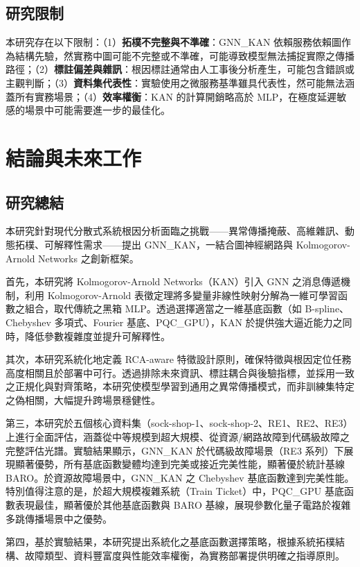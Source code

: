 \documentclass[10pt,a4paper,twocolumn]{article}
\begin{document}
\subsection{研究限制}

本研究存在以下限制：（1）\textbf{拓樸不完整與不準確}：GNN\_KAN 依賴服務依賴圖作為結構先驗，然實務中圖可能不完整或不準確，可能導致模型無法捕捉實際之傳播路徑；（2）\textbf{標註偏差與雜訊}：根因標註通常由人工事後分析產生，可能包含錯誤或主觀判斷；（3）\textbf{資料集代表性}：實驗使用之微服務基準雖具代表性，然可能無法涵蓋所有實務場景；（4）\textbf{效率權衡}：KAN 的計算開銷略高於 MLP，在極度延遲敏感的場景中可能需要進一步的最佳化。

\section{結論與未來工作}

\subsection{研究總結}

本研究針對現代分散式系統根因分析面臨之挑戰——異常傳播掩蔽、高維雜訊、動態拓樸、可解釋性需求——提出 GNN\_KAN，一結合圖神經網路與 Kolmogorov-Arnold Networks 之創新框架。

首先，本研究將 Kolmogorov-Arnold Networks（KAN）引入 GNN 之消息傳遞機制，利用 Kolmogorov-Arnold 表徵定理將多變量非線性映射分解為一維可學習函數之組合，取代傳統之黑箱 MLP。透過選擇適當之一維基底函數（如 B-spline、Chebyshev 多項式、Fourier 基底、PQC\_GPU），KAN 於提供強大逼近能力之同時，降低參數複雜度並提升可解釋性。

其次，本研究系統化地定義 RCA-aware 特徵設計原則，確保特徵與根因定位任務高度相關且於部署中可行。透過排除未來資訊、標註耦合與後驗指標，並採用一致之正規化與對齊策略，本研究使模型學習到通用之異常傳播模式，而非訓練集特定之偽相關，大幅提升跨場景穩健性。

第三，本研究於五個核心資料集（sock-shop-1、sock-shop-2、RE1、RE2、RE3）上進行全面評估，涵蓋從中等規模到超大規模、從資源/網路故障到代碼級故障之完整評估光譜。實驗結果顯示，GNN\_KAN 於代碼級故障場景（RE3 系列）下展現顯著優勢，所有基底函數變體均達到完美或接近完美性能，顯著優於統計基線 BARO。於資源故障場景中，GNN\_KAN 之 Chebyshev 基底函數達到完美性能。特別值得注意的是，於超大規模複雜系統（Train Ticket）中，PQC\_GPU 基底函數表現最佳，顯著優於其他基底函數與 BARO 基線，展現參數化量子電路於複雜多跳傳播場景中之優勢。

第四，基於實驗結果，本研究提出系統化之基底函數選擇策略，根據系統拓樸結構、故障類型、資料豐富度與性能效率權衡，為實務部署提供明確之指導原則。
\end{document}
